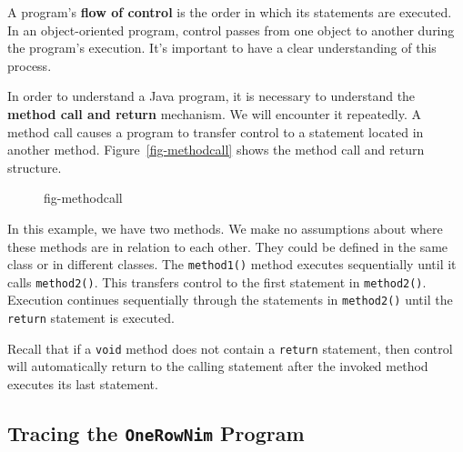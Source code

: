 \noindent A program's {\bf flow of control} is the order
in which its statements are executed. In an object-oriented program,
control passes from one object to another during the program's
execution. It's important to have a clear understanding of this
process.

In order to understand a Java program, it is necessary to understand
the {\bf method call and return} mechanism. We will encounter it
repeatedly.  A method call causes a program to transfer control to a
statement located in another method. Figure~\ref{fig-methodcall} shows
the method call and return structure.
\begin{figure}[h!]
{fig-methodcall}
\end{figure}

In this example, we have two methods. We make no assumptions about
where these methods are in relation to each other. They could be
defined in the same class or in different classes. The {\tt method1()}
method executes sequentially until it calls {\tt method2()}.  This
transfers control to the first statement in {\tt method2()}. Execution
continues sequentially through the statements in {\tt method2()} until
the {\tt return} statement is executed.


\noindent Recall that if a {\tt void}
method does not contain a {\tt return} statement, then control will
automatically return to the calling statement after the invoked method
executes its last statement.


\subsection{Tracing the {\tt OneRowNim} Program}
\label{subsect-trace}

